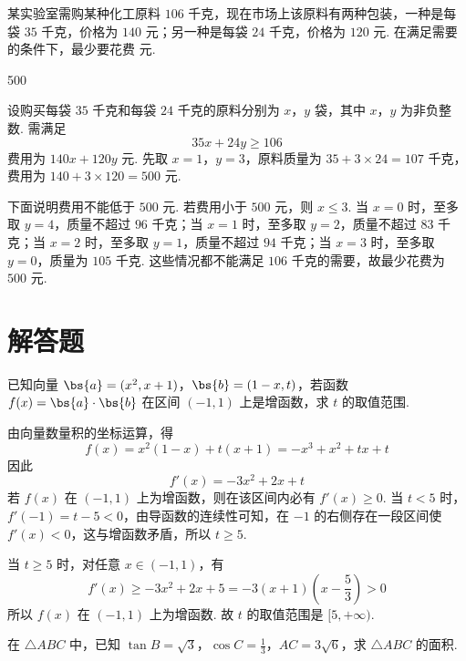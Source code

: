 \begin{problem}
某实验室需购某种化工原料 \(106\) 千克，现在市场上该原料有两种包装，一种是每袋 \(35\) 千克，价格为 \(140\) 元；另一种是每袋 \(24\) 千克，价格为 \(120\) 元. 在满足需要的条件下，最少要花费\fillinblank{} 元.
\end{problem}

\begin{answer}
500
\end{answer}

\begin{solution}
设购买每袋 \(35\) 千克和每袋 \(24\) 千克的原料分别为 \(x\)，\(y\) 袋，其中 \(x\)，\(y\) 为非负整数. 需满足
\[
35x+24y\geqslant106
\]
费用为 \(140x+120y\) 元. 先取 \(x=1\)，\(y=3\)，原料质量为 \(35+3\times24=107\) 千克，费用为 \(140+3\times120=500\) 元.

下面说明费用不能低于 \(500\) 元. 若费用小于 \(500\) 元，则 \(x\leqslant3\). 当 \(x=0\) 时，至多取 \(y=4\)，质量不超过 \(96\) 千克；当 \(x=1\) 时，至多取 \(y=2\)，质量不超过 \(83\) 千克；当 \(x=2\) 时，至多取 \(y=1\)，质量不超过 \(94\) 千克；当 \(x=3\) 时，至多取 \(y=0\)，质量为 \(105\) 千克. 这些情况都不能满足 \(106\) 千克的需要，故最少花费为 \(500\) 元.
\end{solution}

\section{解答题}
\begin{problem}
已知向量 \(\bs{a} = (x^2, x + 1)\)，\(\bs{b} = (1 - x, t)\)，若函数 \(f(x) = \bs{a} \cdot \bs{b}\) 在区间 \((-1, 1)\) 上是增函数，求 \(t\) 的取值范围.
\end{problem}

\begin{solution}
由向量数量积的坐标运算，得
\[
f(x)=x^2(1-x)+t(x+1)=-x^3+x^2+tx+t
\]
因此
\[
f'(x)=-3x^2+2x+t
\]
若 \(f(x)\) 在 \((-1,1)\) 上为增函数，则在该区间内必有 \(f'(x)\geqslant0\). 当 \(t<5\) 时，\(f'(-1)=t-5<0\)，由导函数的连续性可知，在 \(-1\) 的右侧存在一段区间使 \(f'(x)<0\)，这与增函数矛盾，所以 \(t\geqslant5\).

当 \(t\geqslant5\) 时，对任意 \(x\in(-1,1)\)，有
\[
f'(x)\geqslant-3x^2+2x+5=-3(x+1)\left(x-\frac{5}{3}\right)>0
\]
所以 \(f(x)\) 在 \((-1,1)\) 上为增函数. 故 \(t\) 的取值范围是 \([5,+\infty)\).
\end{solution}

\begin{problem}
在 \(\triangle ABC\) 中，已知 \(\tan B = \sqrt{3}\)，\(\cos C = \frac{1}{3}\)，\(AC = 3\sqrt{6}\)，求 \(\triangle ABC\) 的面积.
\end{problem}

